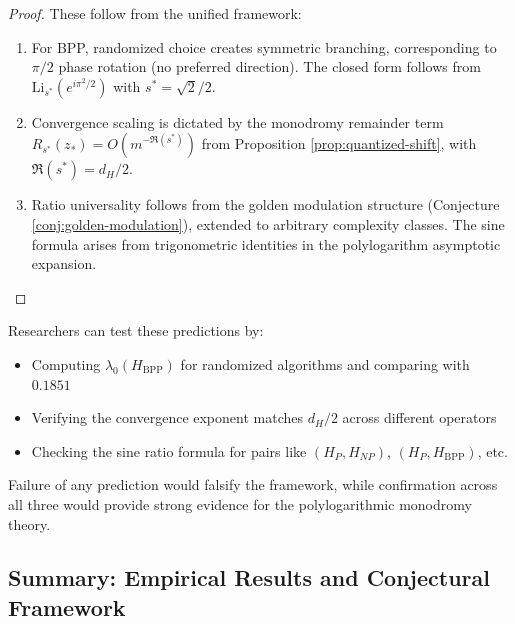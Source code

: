 \begin{proof}
These follow from the unified framework:
\begin{enumerate}
\item For BPP, randomized choice creates symmetric branching, corresponding to $\pi/2$ phase rotation (no preferred direction). The closed form follows from $\mathrm{Li}_{s^*}(e^{i\pi^2/2})$ with $s^* = \sqrt{2}/2$.

\item Convergence scaling is dictated by the monodromy remainder term $R_{s^*}(z_*) = O(m^{-\Re(s^*)})$ from Proposition \ref{prop:quantized-shift}, with $\Re(s^*) = d_H/2$.

\item Ratio universality follows from the golden modulation structure (Conjecture \ref{conj:golden-modulation}), extended to arbitrary complexity classes. The sine formula arises from trigonometric identities in the polylogarithm asymptotic expansion.
\end{enumerate}
\end{proof}

\begin{remark}
Researchers can test these predictions by:
\begin{itemize}
\item Computing $\lambda_0(H_{\text{BPP}})$ for randomized algorithms and comparing with $0.1851$
\item Verifying the convergence exponent matches $d_H/2$ across different operators
\item Checking the sine ratio formula for pairs like $(H_P, H_{NP})$, $(H_P, H_{\text{BPP}})$, etc.
\end{itemize}

Failure of any prediction would falsify the framework, while confirmation across all three would provide strong evidence for the polylogarithmic monodromy theory.
\end{remark}

\subsection{Summary: Empirical Results and Conjectural Framework}

